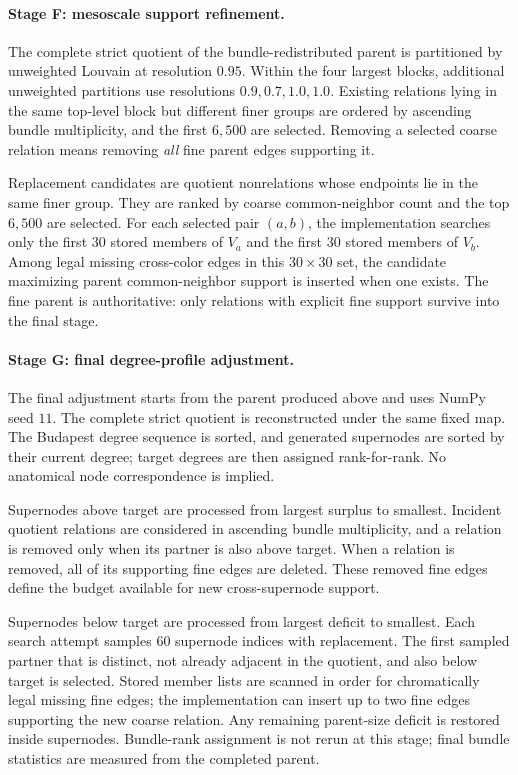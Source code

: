 \documentclass[12pt]{article}
\begin{document}
\paragraph{Stage F: mesoscale support refinement.}
The complete strict quotient of the bundle-redistributed parent is partitioned
by unweighted Louvain at resolution \(0.95\).  Within the four largest blocks,
additional unweighted partitions use resolutions \(0.9,0.7,1.0,1.0\).
Existing relations lying in the same top-level block but different finer
groups are ordered by ascending bundle multiplicity, and the first
\(6{,}500\) are selected.  Removing a selected coarse relation means removing
\emph{all} fine parent edges supporting it.

Replacement candidates are quotient nonrelations whose endpoints lie in the
same finer group.  They are ranked by coarse common-neighbor count and the top
\(6{,}500\) are selected.  For each selected pair \((a,b)\), the implementation
searches only the first \(30\) stored members of \(V_a\) and the first \(30\)
stored members of \(V_b\).  Among legal missing cross-color edges in this
\(30\times30\) set, the candidate maximizing parent common-neighbor support is
inserted when one exists.  The fine parent is authoritative: only relations
with explicit fine support survive into the final stage.

\paragraph{Stage G: final degree-profile adjustment.}
The final adjustment starts from the parent produced above and uses NumPy seed
\(11\).  The complete strict quotient is reconstructed under the same fixed
map.  The Budapest degree sequence is sorted, and generated supernodes are
sorted by their current degree; target degrees are then assigned rank-for-rank.
No anatomical node correspondence is implied.

Supernodes above target are processed from largest surplus to smallest.
Incident quotient relations are considered in ascending bundle multiplicity,
and a relation is removed only when its partner is also above target.  When a
relation is removed, all of its supporting fine edges are deleted.  These
removed fine edges define the budget available for new cross-supernode
support.

Supernodes below target are processed from largest deficit to smallest.  Each
search attempt samples \(60\) supernode indices with replacement.  The first
sampled partner that is distinct, not already adjacent in the quotient, and
also below target is selected.  Stored member lists are scanned in order for
chromatically legal missing fine edges; the implementation can insert up to
two fine edges supporting the new coarse relation.  Any remaining parent-size
deficit is restored inside supernodes.  Bundle-rank assignment is not rerun
at this stage; final bundle statistics are measured from the completed
parent.
\end{document}
